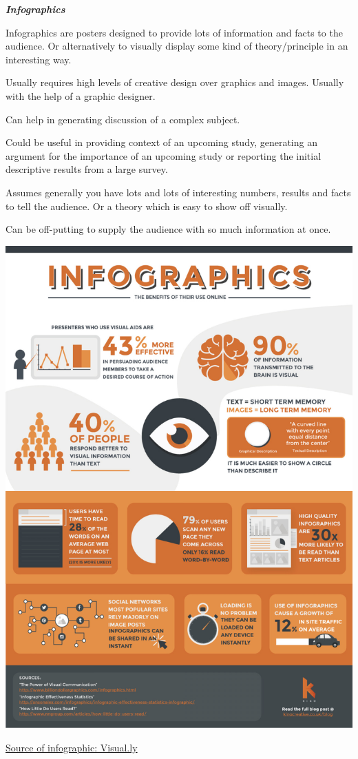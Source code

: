 \documentclass[
  titlepage]{book}
\begin{document}
\textbf{\emph{Infographics}}

Infographics are posters designed to provide lots of information and facts to the audience. Or alternatively to visually display some kind of theory/principle in an interesting way.

Usually requires high levels of creative design over graphics and images. Usually with the help of a graphic designer.

Can help in generating discussion of a complex subject.

Could be useful in providing context of an upcoming study, generating an argument for the importance of an upcoming study or reporting the initial descriptive results from a large survey.

Assumes generally you have lots and lots of interesting numbers, results and facts to tell the audience. Or a theory which is easy to show off visually.

Can be off-putting to supply the audience with so much information at once.

\begin{center}\includegraphics[width=0.75\linewidth,height=0.5\textheight]{img/infographic} \end{center}

\href{https://visual.ly/community/Infographics/technology/infographics-benefits-their-use-online?utm_source=visually_embed}{Source of infographic: Visual.ly}
\end{document}
